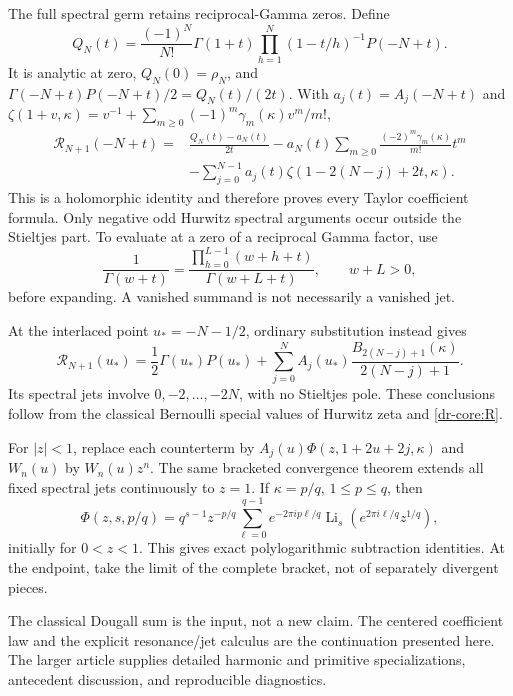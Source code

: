 The full spectral germ retains reciprocal-Gamma zeros. Define
\begin{equation}
 Q_N(t)=\frac{(-1)^N}{N!}\Gamma(1+t)
             \prod_{h=1}^N(1-t/h)^{-1}P(-N+t).
 \label{dr-core:Q}
\end{equation}
It is analytic at zero, $Q_N(0)=\rho_N$, and
$\Gamma(-N+t)P(-N+t)/2=Q_N(t)/(2t)$.
With $a_j(t)=A_j(-N+t)$ and
$\zeta(1+v,\kappa)=v^{-1}+\sum_{m\geq0}(-1)^m\gamma_m(\kappa)v^m/m!$,
\begin{equation}
\begin{split}
 \mathcal R_{N+1}(-N+t)={}&\frac{Q_N(t)-a_N(t)}{2t}
 -a_N(t)\sum_{m\geq0}\frac{(-2)^m\gamma_m(\kappa)}{m!}t^m\\
 &-\sum_{j=0}^{N-1}a_j(t)\zeta(1-2(N-j)+2t,\kappa).
\end{split}
\label{dr-core:jet}
\end{equation}
This is a holomorphic identity and therefore proves every Taylor
coefficient formula. Only negative odd Hurwitz spectral arguments occur
outside the Stieltjes part. To evaluate at a zero of a reciprocal Gamma
factor, use
\[
 \frac1{\Gamma(w+t)}=
 \frac{\prod_{h=0}^{L-1}(w+h+t)}{\Gamma(w+L+t)},\qquad w+L>0,
\]
before expanding. A vanished summand is not necessarily a vanished jet.

At the interlaced point $u_*=-N-1/2$, ordinary substitution instead gives
\begin{equation}
 \mathcal R_{N+1}(u_*)=\frac12\Gamma(u_*)P(u_*)+
 \sum_{j=0}^N A_j(u_*)\frac{B_{2(N-j)+1}(\kappa)}{2(N-j)+1}.
 \label{dr-core:half}
\end{equation}
Its spectral jets involve $0,-2,\ldots,-2N$, with no Stieltjes pole.
These conclusions follow from the classical Bernoulli special values of
Hurwitz zeta \cite{dougall-resonance:DLMF25} and \eqref{dr-core:R}.

For $|z|<1$, replace each counterterm by
$A_j(u)\Phi(z,1+2u+2j,\kappa)$ and $W_n(u)$ by $W_n(u)z^n$.
The same bracketed convergence theorem extends all fixed spectral jets
continuously to $z=1$. If $\kappa=p/q$, $1\leq p\leq q$, then
\[
 \Phi(z,s,p/q)=q^{s-1}z^{-p/q}\sum_{\ell=0}^{q-1}
       e^{-2\pi i p\ell/q}\operatorname{Li}_s(e^{2\pi i\ell/q}z^{1/q}),
\]
initially for $0<z<1$. This gives exact polylogarithmic subtraction
identities. At the endpoint, take the limit of the complete bracket,
not of separately divergent pieces.

The classical Dougall sum is the input, not a new claim. The centered
coefficient law and the explicit resonance/jet calculus are the continuation
presented here. The larger article supplies detailed harmonic and primitive
specializations, antecedent discussion, and reproducible diagnostics.
